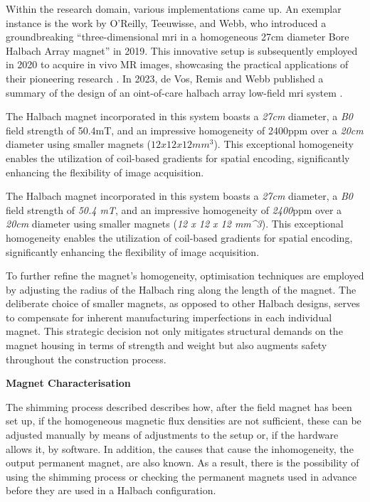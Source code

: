 Within the research domain, various implementations came up. An exemplar
instance is the work by O'Reilly, Teeuwisse, and Webb, who introduced a
groundbreaking ``three-dimensional \gls{mri} in a homogeneous 27cm
diameter Bore Halbach Array magnet'' \cite{OReilly2019-rn} in 2019.
This innovative setup is subsequently employed in 2020 to acquire in
vivo MR images, showcasing the practical applications of their
pioneering research \cite{OReilly2021-ep}. In 2023, de Vos, Remis
and Webb published a summary of the design of an oint-of-care halbach
array low-field \gls{mri} system \cite{De_Vos2023-pb}.

The Halbach magnet incorporated in this system boasts a \emph{27cm}
diameter, a \emph{B0} field strength of 50.4mT, and an impressive
homogeneity of 2400\gls{ppm} over a \emph{20cm} diameter using smaller
magnets (\(12 x 12 x 12 mm^3\)). This exceptional homogeneity enables
the utilization of coil-based gradients for spatial encoding,
significantly enhancing the flexibility of image acquisition.

The Halbach magnet incorporated in this system boasts a \emph{27cm}
diameter, a \emph{B0} field strength of \emph{50.4 mT}, and an
impressive homogeneity of \emph{2400}\gls{ppm} over a \emph{20cm}
diameter using smaller magnets (\emph{12 x 12 x 12 mm\^{}3}). This
exceptional homogeneity enables the utilization of coil-based gradients
for spatial encoding, significantly enhancing the flexibility of image
acquisition.

To further refine the magnet's homogeneity, optimisation techniques are
employed by adjusting the radius of the Halbach ring along the length of
the magnet. The deliberate choice of smaller magnets, as opposed to
other Halbach designs, serves to compensate for inherent manufacturing
imperfections in each individual magnet. This strategic decision not
only mitigates structural demands on the magnet housing in terms of
strength and weight but also augments safety throughout the construction
process.

\textbf{Magnet Characterisation}

The shimming process described describes how, after the field magnet has
been set up, if the homogeneous magnetic flux densities are not
sufficient, these can be adjusted manually by means of adjustments to
the setup or, if the hardware allows it, by software. In addition, the
causes that cause the inhomogeneity, the output permanent magnet, are
also known. As a result, there is the possibility of using the shimming
process or checking the permanent magnets used in advance before they
are used in a Halbach configuration.

